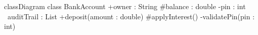 \documentclass[border=4pt,varwidth=20cm]{standalone}
\begin{document}
\begin{mermaid}
classDiagram
  class BankAccount {
    +owner : String
    #balance : double
    -pin : int
    ~auditTrail : List
    +deposit(amount : double)
    #applyInterest()
    -validatePin(pin : int)
  }
\end{mermaid}
\end{document}
